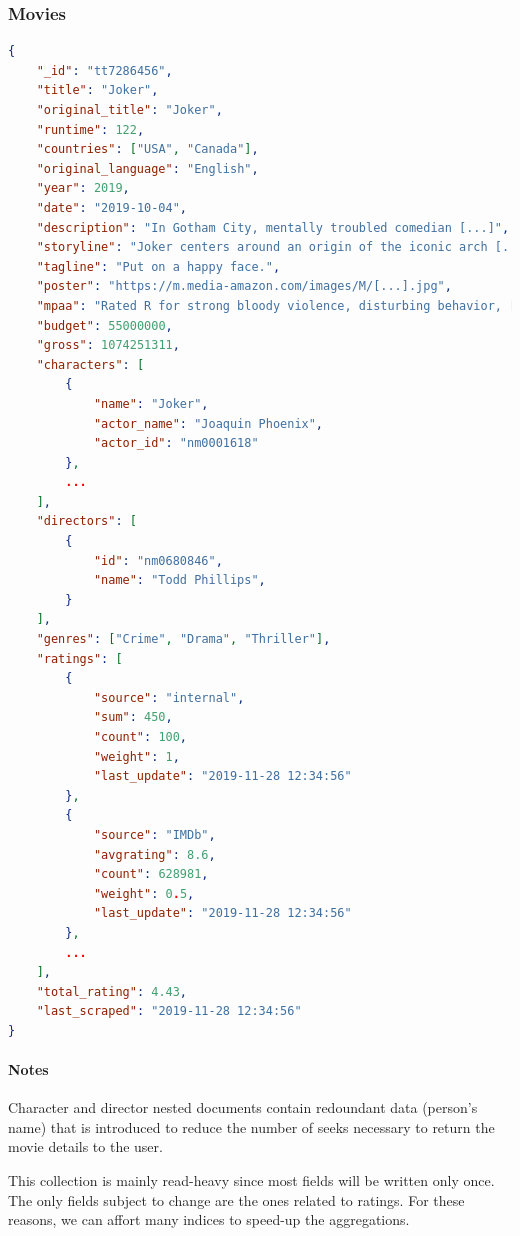 \documentclass[11pt]{article}
\begin{document}
\subsubsection{Movies}
\label{sec:movies}

\begin{lstlisting}[language=json]	
{
	"_id": "tt7286456",
	"title": "Joker",
	"original_title": "Joker",
	"runtime": 122,
	"countries": ["USA", "Canada"],
	"original_language": "English",
	"year": 2019,
	"date": "2019-10-04",
	"description": "In Gotham City, mentally troubled comedian [...]",
	"storyline": "Joker centers around an origin of the iconic arch [...]",
	"tagline": "Put on a happy face.",
	"poster": "https://m.media-amazon.com/images/M/[...].jpg",
	"mpaa": "Rated R for strong bloody violence, disturbing behavior, [...]",
	"budget": 55000000,
	"gross": 1074251311, 
	"characters": [
		{
			"name": "Joker",
			"actor_name": "Joaquin Phoenix",
			"actor_id": "nm0001618"
		},
		...
	],
	"directors": [
		{
			"id": "nm0680846",
			"name": "Todd Phillips",
		}
	],
	"genres": ["Crime", "Drama", "Thriller"],
	"ratings": [
		{
			"source": "internal",
			"sum": 450,
			"count": 100,
			"weight": 1,
			"last_update": "2019-11-28 12:34:56"
		},
		{
			"source": "IMDb",
			"avgrating": 8.6,
			"count": 628981,
			"weight": 0.5,
			"last_update": "2019-11-28 12:34:56"
		},
		...
	],
	"total_rating": 4.43,
	"last_scraped": "2019-11-28 12:34:56"
}
\end{lstlisting}

\paragraph{Notes}
Character and director nested documents contain redoundant data (person's name) that is introduced to reduce the number of seeks necessary to return the movie details
to the user.

This collection is mainly read-heavy since most fields will be written only once.
The only fields subject to change are the ones related to ratings. For these reasons,
we can affort many indices to speed-up the aggregations.
\end{document}

